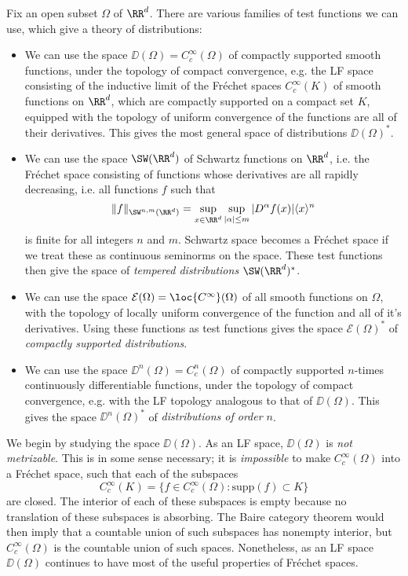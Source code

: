 Fix an open subset $\Omega$ of $\RR^d$. There are various families of test functions we can use, which give a theory of distributions:
%
\begin{itemize}
    \item We can use the space $\DD(\Omega) = C_c^\infty(\Omega)$ of compactly supported smooth functions, under the topology of compact convergence, e.g. the LF space consisting of the inductive limit of the Fr\'{e}chet spaces $C^\infty_c(K)$ of smooth functions on $\RR^d$, which are compactly supported on a compact set $K$, equipped with the topology of uniform convergence of the functions are all of their derivatives. This gives the most general space of distributions $\DD(\Omega)^*$.

    \item We can use the space $\SW(\RR^d)$ of Schwartz functions on $\RR^d$, i.e. the Fr\'{e}chet space consisting of functions whose derivatives are all rapidly decreasing, i.e. all functions $f$ such that
    \[ \| f \|_{\SW^{n,m}(\RR^d)} = \sup_{x \in \RR^d} \sup_{|\alpha| \leq m} |D^\alpha f(x)| \langle x \rangle^n \]
    is finite for all integers $n$ and $m$. Schwartz space becomes a Fr\'{e}chet space if we treat these as continuous seminorms on the space. These test functions then give the space of \emph{tempered distributions} $\SW(\RR^d)^*$.

    \item We can use the space $\mathcal{E}(\Omega) = \loc{C^\infty}(\Omega)$ of all smooth functions on $\Omega$, with the topology of locally uniform convergence of the function and all of it's derivatives. Using these functions as test functions gives the space $\mathcal{E}(\Omega)^*$ of \emph{compactly supported distributions}.

    \item We can use the space $\DD^n(\Omega) = C_c^n(\Omega)$ of compactly supported $n$-times continuously differentiable functions, under the topology of compact convergence, e.g. with the LF topology analogous to that of $\DD(\Omega)$. This gives the space $\DD^n(\Omega)^*$ of \emph{distributions of order $n$}.
\end{itemize}
%
We begin by studying the space $\DD(\Omega)$. As an LF space, $\DD(\Omega)$ is \emph{not metrizable}. This is in some sense necessary; it is \emph{impossible} to make $C_c^\infty(\Omega)$ into a Fr\'{e}chet space, such that each of the subspaces
%
\[ C_c^\infty(K) = \{ f \in C_c^\infty(\Omega): \text{supp}(f) \subset K \} \]
%
are closed. The interior of each of these subspaces is empty because no translation of these subspaces is absorbing. The Baire category theorem would then imply that a countable union of such subspaces has nonempty interior, but $C_c^\infty(\Omega)$ is the countable union of such spaces. Nonetheless, as an LF space $\DD(\Omega)$ continues to have most of the useful properties of Fr\'{e}chet spaces.
